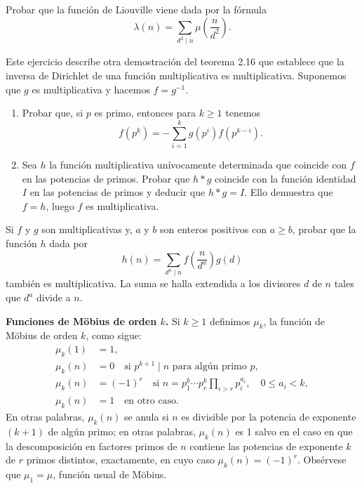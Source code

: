 \documentclass[12pt,a4paper]{book}
\begin{document}
    \begin{ejercicio}
        Probar que la función de Liouville viene dada por la fórmula
        \begin{equation*}
            \lambda(n)=\sum_{d^2\mid n}\mu\left(\frac{n}{d^2}\right).
        \end{equation*}
    \end{ejercicio}

    \begin{ejercicio}
        Este ejercicio describe otra demostración del teorema 2.16 que establece que la
        inversa de Dirichlet de una función multiplicativa es multiplicativa. Suponemos
        que $g$ es multiplicativa y hacemos $f=g^{-1}$.
        \begin{enumerate}
            \item[(a)] Probar que, si $p$ es primo, entonces para $k\geq1$ tenemos
            \begin{equation*}
                f(p^k)=-\sum_{i=1}^{k}g(p^i)f(p^{k-i}).
            \end{equation*}
            \item[(b)] Sea $h$ la función multiplicativa unívocamente determinada que
            coincide con $f$ en las potencias de primos. Probar que $h*g$ coincide con la
            función identidad $I$ en las potencias de primos y deducir que $h*g=I$. Ello
            demuestra que $f=h$, luego $f$ es multiplicativa.
        \end{enumerate}
    \end{ejercicio}

    \begin{ejercicio}
        Si $f$ y $g$ son multiplicativas y, $a$ y $b$ son enteros positivos con $a\geq b$,
        probar que la función $h$ dada por
        \begin{equation*}
            h(n)=\sum_{d^a\mid n}f\left(\frac{n}{d^a}\right)g(d)
        \end{equation*}
        también es multiplicativa. La suma se halla extendida a los divisores $d$ de $n$
        tales que $d^a$ divide a $n$.
    \end{ejercicio}

    \textbf{Funciones de Möbius de orden $k$.} Si $k\geq1$ definimos $\mu_k$, la función de
    Möbius de orden $k$, como sigue:
    \begin{align*}
        \mu_k(1)&=1,\\
        \mu_k(n)&=0 \quad\text{si } p^{k+1}\mid n \text{ para algún primo } p,\\
        \mu_k(n)&=(-1)^r \quad\text{si } n=p_1^k\cdots p_r^k\prod_{i>r}p_i^{a_i},\quad
        0\leq a_i<k,\\
        \mu_k(n)&=1 \quad\text{en otro caso.}
    \end{align*}
    En otras palabras, $\mu_k(n)$ se anula si $n$ es divisible por la potencia de exponente
    $(k+1)$ de algún primo; en otras palabras, $\mu_k(n)$ es 1 salvo en el caso en que la
    descomposición en factores primos de $n$ contiene las potencias de exponente $k$ de $r$
    primos distintos, exactamente, en cuyo caso $\mu_k(n)=(-1)^r$. Obsérvese que
    $\mu_1=\mu$, función usual de Möbius.
\end{document}
